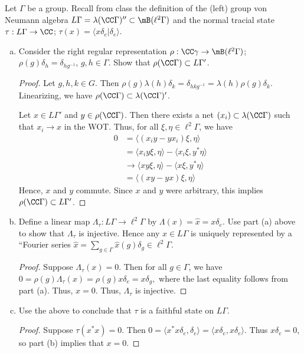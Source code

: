 \documentclass{article}
\begin{document}
 Let $\Gamma$ be a group. Recall from class the definition of the (left) group von Neumann algebra $L\Gamma = \lambda(\CC \Gamma)'' \subset \mB(\ell^2\Gamma)$ and the normal tracial state $\tau : L\Gamma \to \CC$; $\tau(x) = \langle x \delta_e | \delta_e \rangle$.
\begin{enumerate}[(a)]
\item Consider the right regular representation $\rho : \CC \gamma \to \mB(\ell^2\Gamma)$; $\rho(g) \delta_h = \delta_{hg^{-1}}$, $g, h \in \Gamma$. Show that $\rho(\CC \Gamma) \subset L \Gamma'$.
  \begin{proof}
    Let $g,h,k \in G$.  Then $\rho(g) \lambda(h) \delta_k = \delta_{hkg^{-1}} = \lambda(h) \rho(g) \delta_k$.  Linearizing, we have $\rho(\CC \Gamma) \subset \lambda(\CC \Gamma)'$.
    
    Let $x \in L \Gamma'$ and $y \in \rho(\CC \Gamma)$. Then there exists a net $(x_i) \subset \lambda(\CC \Gamma)$ such that $x_i \to x$ in the WOT. Thus, for all $\xi, \eta \in \ell^2 \Gamma$, we have
\begin{align*}
    0 & = \langle (x_i y - y x_i) \xi, \eta \rangle \\
    & =  \langle x_i y \xi, \eta \rangle - \langle x_i \xi, y^* \eta \rangle \\
    & \to  \langle x  y \xi, \eta \rangle - \langle x \xi, y^* \eta \rangle \\ 
    & = \langle (x y - y x) \xi, \eta \rangle
\end{align*}
Hence, $x$ and $y$ commute.  Since $x$ and $y$ were arbitrary, this implies  $\rho(\CC \Gamma) \subset L \Gamma'$.
  \end{proof}
\item Define a linear map $\Lambda_\tau : L \Gamma \to \ell^2 \Gamma$ by $\Lambda(x) = \hat{x} = x \delta_e$. Use part (a) above to show that $\Lambda_\tau$ is injective.  Hence any $x \in L \Gamma$ is uniquely represented by a ``Fourier series $\hat{x} = \sum_{g \in \Gamma} \hat{x}(g) \delta_g \in \ell^2 \Gamma$.
  \begin{proof}
    Suppose $\Lambda_\tau(x) = 0$. Then for all $g \in \Gamma$, we have
    $0 = \rho(g) \Lambda_\tau(x) = \rho(g) x \delta_e = x \delta_g,$ where the
    last equality follows from part (a).  Thus, $x = 0$.  Thus, $\Lambda_\tau$ is injective.
  \end{proof}
\item Use the above to conclude that $\tau$ is a faithful state on $L\Gamma$.
  \begin{proof}
    Suppose $\tau(x^* x) = 0$.  Then $0 = \langle x^* x \delta_e, \delta_e \rangle = \langle x \delta_e, x \delta_e \rangle$.  Thus $x \delta_e = 0$, so part (b) implies that $x = 0$.

\end{proof}
\end{enumerate}
\end{document}
